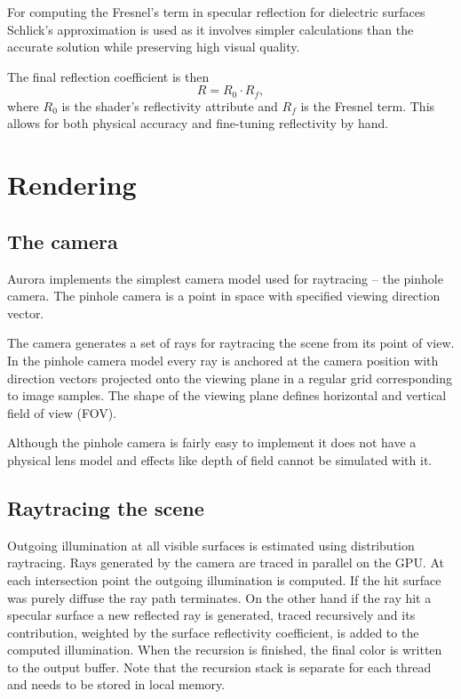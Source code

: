 For computing the Fresnel's term in specular reflection for dielectric surfaces Schlick's approximation \parencite{schlick94} is used as it involves simpler calculations than the accurate solution while preserving high visual quality.

The final reflection coefficient is then
\begin{equation}
  R = R_{0} \cdot R_{f},
\end{equation}
where $R_{0}$ is the shader's reflectivity attribute and $R_{f}$ is the Fresnel term. This allows for both physical accuracy and fine-tuning reflectivity by hand.

\section{Rendering}

\subsection{The camera}
Aurora implements the simplest camera model used for raytracing -- the pinhole camera. The pinhole camera is a point in space with specified viewing direction vector.

The camera generates a set of rays for raytracing the scene from its point of view. In the pinhole camera model every ray is anchored at the camera position with direction vectors projected onto the viewing plane in a regular grid corresponding to image samples. The shape of the viewing plane defines horizontal and vertical field of view (FOV).

Although the pinhole camera is fairly easy to implement it does not have a physical lens model and effects like depth of field cannot be simulated with it.

\subsection{Raytracing the scene}
Outgoing illumination at all visible surfaces is estimated using distribution raytracing. Rays generated by the camera are traced in parallel on the GPU. At each intersection point the outgoing illumination is computed. If the hit surface was purely diffuse the ray path terminates. On the other hand if the ray hit a specular surface a new reflected ray is generated, traced recursively and its contribution, weighted by the surface reflectivity coefficient, is added to the computed illumination. When the recursion is finished, the final color is written to the output buffer. Note that the recursion stack is separate for each thread and needs to be stored in local memory.

